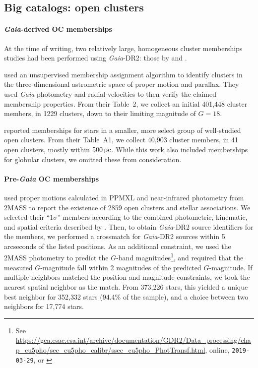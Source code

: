 \documentclass[12pt,twocolumn,tighten]{aastex62}
\begin{document}

\subsection{Big catalogs: open clusters}
\label{subsec:oc}

\paragraph{{\it Gaia}-derived OC memberships}
At the time of writing, two relatively large, homogeneous cluster
memberships studies had been performed using {\it Gaia}-DR2: those by
\citet{cantat-gaudin_gaia_2018} and \citet{gaia_hr_2018}.

\citet{cantat-gaudin_gaia_2018} used an unsupervised membership
assignment algorithm to identify clusters in the three-dimensional
astrometric space of proper motion and parallax. They used {\it Gaia}
photometry and radial velocities to then verify the claimed
membership properties.  From their Table~2, we collect an initial 401{,}448
cluster members, in 1229 clusters, down to their limiting magnitude of
$G=18$.

\citet{gaia_hr_2018} reported memberships for stars in a smaller, more
select group of well-studied open clusters. From their Table~A1, we
collect 40{,}903 cluster members, in 41 open clusters, mostly within
$500\,{\rm pc}$. While this work also included memberships for
globular clusters, we omitted these from consideration.


\paragraph{Pre-{\it Gaia} OC memberships}
\citet{Kharchenko_et_al_2013} used proper motions calculated in PPMXL
\citep[][a combination of USNO-B1{.}0 and 2MASS
astrometry]{roeser_ppmxl_2010} and near-infrared photometry from 2MASS
\citep{skrutskie_tmass_2006} to report the existence of 2859 open
clusters and stellar associations.
We selected their ``$1\sigma$'' members according to the
combined photometric, kinematic, and spatial criteria described by
\citet{kharchenko_global_2012}.  Then, to obtain {\it Gaia}-DR2 source
identifiers for the members, we performed a crossmatch for {\it
Gaia}-DR2 sources within 5 arcseconds of the listed positions.  As an
additional constraint, we used the 2MASS photometry to predict the
$G$-band magnitudes\footnote{See
\url{https://gea.esac.esa.int/archive/documentation/GDR2/Data_processing/chap_cu5pho/sec_cu5pho_calibr/ssec_cu5pho_PhotTransf.html},
online, \texttt{2019-03-29}, or \citet{carrasco_gaia_2016}}, and
required that the measured $G$-magnitude fall within 2 magnitudes of
the predicted $G$-magnitude.  If multiple neighbors matched the
position and magnitude constraints, we took the nearest spatial
neighbor as the match.  From 373{,}226 stars, this yielded a unique
best neighbor for 352{,}332 stars (94.4\% of the sample), and a choice
between two neighbors for 17{,}774 stars. 
\end{document}
